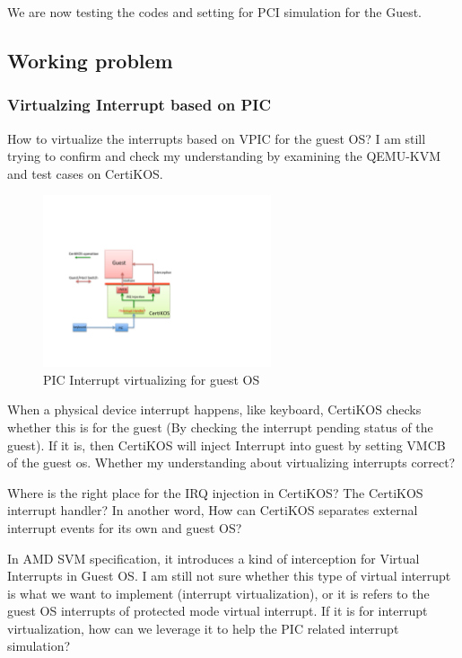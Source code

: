 \documentclass[a4paper,12pt]{article}
\begin{document}
We are now testing the codes and setting for PCI simulation for the Guest.

\subsection{Working problem}

\subsubsection{Virtualzing Interrupt  based on PIC}

How to virtualize the interrupts based on VPIC  for the guest OS? I am still trying to confirm and  check my understanding by  examining the QEMU-KVM and test cases on CertiKOS. 
  \begin{figure}[!ht]
 \centerline{
 \includegraphics[width=0.6\textwidth]{interrupt_injection}}
 \caption{PIC Interrupt virtualizing for guest OS} \label{fig:interruptinjection}
\end{figure}

When a physical device interrupt happens, like keyboard,  CertiKOS checks whether this is for the guest (By checking the interrupt pending status of the guest). If it is, then CertiKOS will inject Interrupt into guest by setting VMCB of the guest os.   Whether my understanding about virtualizing interrupts correct? 

Where is the right place for the IRQ injection in CertiKOS? The CertiKOS interrupt handler?  In another word, How can CertiKOS separates external interrupt events for its own and guest OS? 

In AMD SVM specification, it introduces a kind of interception for Virtual Interrupts in Guest OS.   I am still not sure whether this type of virtual interrupt is what we want to implement (interrupt virtualization),  or  it is refers to the guest OS  interrupts of protected mode virtual interrupt. If it is for interrupt virtualization, how can we leverage it to help the PIC related interrupt simulation?  
\end{document}
